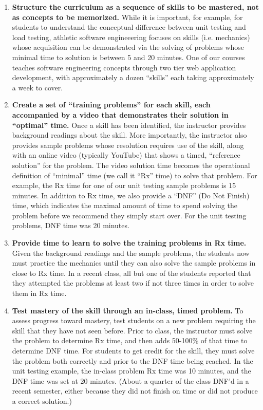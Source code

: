 \begin{enumerate}

\item {\bf Structure the curriculum as a sequence of skills to be mastered, not as concepts to be memorized.} While it is important, for example, for students to understand the conceptual difference between unit testing and load testing, athletic software engineeering focuses on skills (i.e. mechanics) whose acquisition can be demonstrated via the solving of problems whose minimal time to solution is between 5 and 20 minutes.  One of our courses teaches software engineering concepts through two tier web application development, with approximately a dozen ``skills'' each taking approximately a week to cover.

\item {\bf Create a set of ``training problems'' for each skill, each accompanied by a video that demonstrates their solution in ``optimal'' time.} Once a skill has been identified, the instructor provides background readings about the skill.  More importantly, the instructor also provides sample problems whose resolution requires use of the skill, along with an online video (typically YouTube) that shows a timed, ``reference solution'' for the problem. The video solution time becomes the operational definition of ``minimal'' time (we call it ``Rx'' time) to solve that problem. For example, the Rx time for one of our unit testing sample problems is 15 minutes. In addition to Rx time, we also provide a ``DNF'' (Do Not Finish) time, which indicates the maximal amount of time to spend solving the problem before we recommend they simply start over. For the unit testing problems, DNF time was 20 minutes. 

\item {\bf Provide time to learn to solve the training problems in Rx time.} Given the background readings and the sample problems, the students now must practice the mechanics until they can also solve the sample problems in close to Rx time.  In a recent class, all but one of the students reported that they attempted the problems at least two if not three times in order to solve them in Rx time. 

\item {\bf Test mastery of the skill through an in-class, timed problem.} To assess progress toward mastery, test students on a new problem requiring the skill that they have not seen before.  Prior to class, the instructor must solve the problem to determine Rx time, and then adds 50-100\% of that time to determine DNF time.  For students to get credit for the skill, they must solve the problem both correctly and prior to the DNF time being reached.  In the unit testing example, the in-class problem Rx time was 10 minutes, and the DNF time was set at 20 minutes.  (About a quarter of the class DNF'd in a recent semester, either because they did not finish on time or did not produce a correct solution.) 


\end{enumerate}
